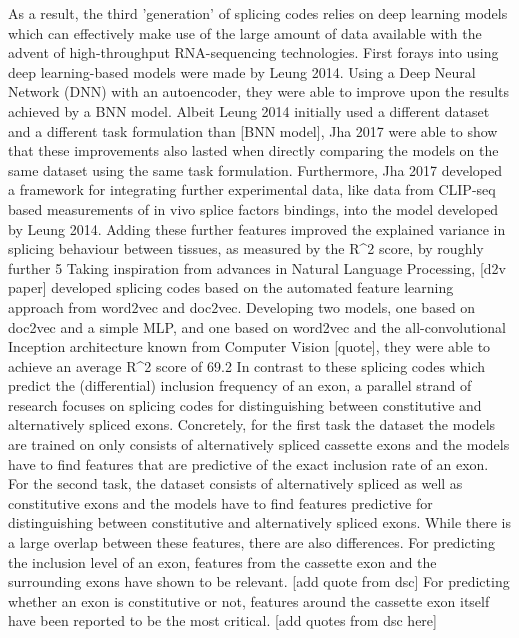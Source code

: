As a result, the third 'generation' of splicing codes relies on deep learning models which can effectively make use of the large amount of data available with the advent of high-throughput RNA-sequencing technologies. First forays into using deep learning-based models were made by Leung 2014. Using a Deep Neural Network (DNN) with an autoencoder, they were able to improve upon the results achieved by a BNN model. Albeit Leung 2014 initially used a different dataset and a different task formulation than [BNN model], Jha 2017 were able to show that these improvements also lasted when directly comparing the models on the same dataset using the same task formulation. Furthermore, Jha 2017 developed a framework for integrating further experimental data, like data from CLIP-seq based measurements of in vivo splice factors bindings, into the model developed by Leung 2014. Adding these further features improved the explained variance in splicing behaviour between tissues, as measured by the R^2 score, by roughly further 5%
Taking inspiration from advances in Natural Language Processing, [d2v paper] developed splicing codes based on the automated feature learning approach from word2vec and doc2vec. Developing two models, one based on doc2vec and a simple MLP, and one based on word2vec and the all-convolutional Inception architecture known from Computer Vision [quote], they were able to achieve an average R^2 score of 69.2%
In contrast to these splicing codes which predict the (differential) inclusion frequency of an exon, a parallel strand of research focuses on splicing codes for distinguishing between constitutive and alternatively spliced exons. Concretely, for the first task the dataset the models are trained on only consists of alternatively spliced cassette exons and the models have to find features that are predictive of the exact inclusion rate of an exon.
For the second task, the dataset consists of alternatively spliced as well as constitutive exons and the models have to find features predictive for distinguishing between constitutive and alternatively spliced exons.
While there is a large overlap between these features, there are also differences.
For predicting the inclusion level of an exon, features from the cassette exon and the surrounding exons have shown to be relevant. [add quote from dsc] For predicting whether an exon is constitutive or not, features around the cassette exon itself have been reported to be the most critical. [add quotes from dsc here]
